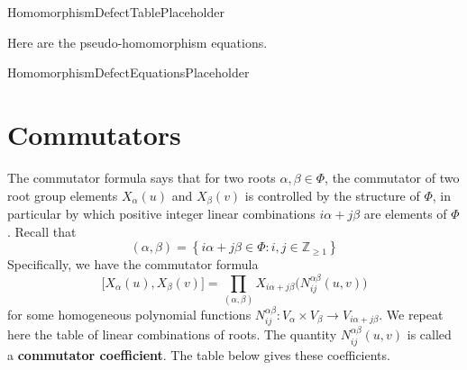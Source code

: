 \documentclass[11pt]{article}
\newcommand{\noi}{\noindent}
\newcommand{\tbf}{\textbf}
\newcommand{\lb}{\left\{}
\newcommand{\rb}{\right\}}
\newcommand{\Z}{\mathbb{Z}}
\theoremstyle{definition}
\newif\ifsummablepairs
\begin{document}
\bigskip

HomomorphismDefectTablePlaceholder

\bigskip

\noi Here are the pseudo-homomorphism equations.

HomomorphismDefectEquationsPlaceholder

\fi

\newpage
\section{Commutators}

The commutator formula says that for two roots $\alpha, \beta \in \Phi$, the commutator of two root group elements $X_\alpha(u)$ and $X_\beta(v)$ is controlled by the structure of $\Phi$, in particular by which positive integer linear combinations $i\alpha + j\beta$ are elements of $\Phi$. Recall that
\[
	(\alpha, \beta) = \lb i \alpha + j\beta \in \Phi : i, j \in \Z_{\ge 1} \rb
\]
Specifically, we have the commutator formula
\[
	\Big[ X_\alpha(u), X_\beta(v) \Big] = \prod_{(\alpha, \beta)} X_{i\alpha + j\beta} \Big( N_{ij}^{\alpha \beta}(u,v) \Big)
\]
for some homogeneous polynomial functions $N_{ij}^{\alpha \beta}:V_{\alpha} \times V_{\beta} \to V_{i\alpha+j\beta}$. 
\ifsummablepairs
We repeat here the table of linear combinations of roots. The quantity $N_{ij}^{\alpha \beta}(u,v)$ is called a \tbf{commutator coefficient}. The table below gives these coefficients.

\bigskip
\end{document}
